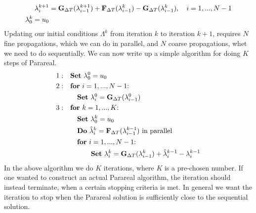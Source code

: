 \begin{align}
\lambda_{i}^{k+1} &= \bold G_ {\Delta T}(\lambda_{i-1}^{k+1})+\bold F_ {\Delta T}( \lambda_{i-1}^{k})-\bold G_ {\Delta T}( \lambda_{i-1}^{k}), \quad i=1,...,N-1 \label{pred_corr_PR} \\
\lambda_0^k = u_0
\end{align}
Updating our initial conditions $\Lambda^k$ from iteration $k$ to iteration $k+1$, requires $N$ fine propagations, which we can do in parallel, and $N$ coarse propagations, whet we need to do sequentially. We can now write up a simple algorithm for doing $K$ steps of Parareal.
\begin{align*}
1:\quad&\textrm{$\bold{Set}$ $\lambda_0^0=u_0$} \\
2:\quad&\textrm{$\bold{for}$ $i=1,...,N-1$:} \\
&\quad\bold{Set} \ \lambda_i^0=\bold G_ {\Delta T}(\lambda_{i-1}^0) \\
3:\quad&\textrm{$\bold{for}$ $k=1,...,K$:} \\
&\quad\textrm{$\bold{Set}$ $\lambda_0^k=u_0$} \\
&\quad\textrm{$\bold{Do}$ $\hat \lambda_i^k=\bold F_ {\Delta T}( \lambda_{i-1}^{k-1})$ in parallel} \\
&\quad\textrm{$\bold{for}$ $i=1,...,N-1$:} \\
&\quad \quad \quad \bold{Set} \ \lambda_{i}^{k} = \bold G_ {\Delta T}(\lambda_{i-1}^{k})+\hat\lambda_i^{k-1}-\lambda_i^{k-1}
\end{align*}
In the above algorithm we do $K$ iterations, where $K$ is a pre-chosen number. If one wanted to construct an actual Parareal algorithm, the iteration should instead terminate, when a certain stopping criteria is met. In general we want the iteration to stop when the Parareal solution is sufficiently close to the sequential solution. 
